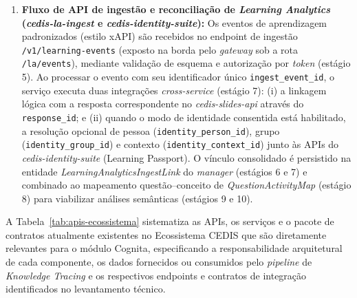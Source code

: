 \begin{enumerate}
    \item \textbf{Fluxo de API de ingestão e reconciliação de \textit{Learning Analytics} (\textit{cedis-la-ingest} e \textit{cedis-identity-suite}):} Os eventos de aprendizagem padronizados (estilo xAPI) são recebidos no endpoint de ingestão \texttt{/v1/learning-events} (exposto na borda pelo \textit{gateway} sob a rota \texttt{/la/events}), mediante validação de esquema e autorização por \textit{token} (estágio 5). Ao processar o evento com seu identificador único \texttt{ingest\_event\_id}, o serviço executa duas integrações \textit{cross-service} (estágio 7): (i) a linkagem lógica com a resposta correspondente no \textit{cedis-slides-api} através do \texttt{response\_id}; e (ii) quando o modo de identidade consentida está habilitado, a resolução opcional de pessoa (\texttt{identity\_person\_id}), grupo (\texttt{identity\_group\_id}) e contexto (\texttt{identity\_context\_id}) junto às APIs do \textit{cedis-identity-suite} (Learning Passport). O vínculo consolidado é persistido na entidade \textit{LearningAnalyticsIngestLink} do \textit{manager} (estágios 6 e 7) e combinado ao mapeamento questão--conceito de \textit{QuestionActivityMap} (estágio 8) para viabilizar análises semânticas (estágios 9 e 10).
\end{enumerate}

A Tabela~\ref{tab:apis-ecossistema} sistematiza as APIs, os serviços e o pacote de contratos atualmente existentes no Ecossistema CEDIS que são diretamente relevantes para o módulo Cognita, especificando a responsabilidade arquitetural de cada componente, os dados fornecidos ou consumidos pelo \textit{pipeline} de \textit{Knowledge Tracing} e os respectivos endpoints e contratos de integração identificados no levantamento técnico.

